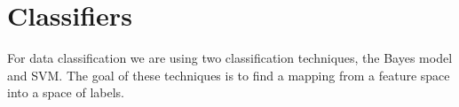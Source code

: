 \chapter{Classifiers}
For data classification we are using two classification techniques, the Bayes model and SVM. The goal of these techniques is to find a mapping from a feature space into a space of labels.






